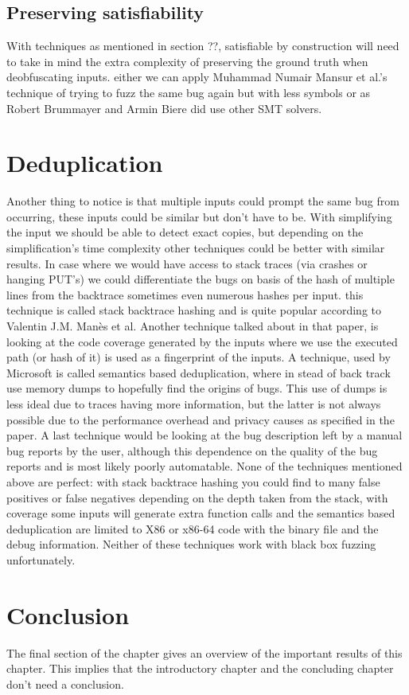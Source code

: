 \subsection{Preserving satisfiability}
With techniques as mentioned in section ??, satisfiable by construction will need to take in mind the extra complexity of preserving the ground truth when deobfuscating inputs. either we can apply Muhammad Numair Mansur et al.'s\cite{1mansur2020detecting} technique of trying to fuzz the same bug again but with less symbols or as Robert Brummayer and Armin Biere\cite{2FuzzingAndDelta-debuggingSMTSolvers} did use other SMT solvers.

\section{Deduplication}
\label{cha:3:Deduplication}
Another thing to notice is that multiple inputs could prompt the same bug from occurring, these inputs could be similar but don't have to be. With simplifying the input we should be able to detect exact copies, but depending on the simplification's time complexity other techniques could be better with similar results. In case where we would have access to stack traces (via crashes or hanging PUT's) we could differentiate the bugs on basis of the hash of multiple lines from the backtrace sometimes even numerous hashes per input. this technique is called stack backtrace hashing and is quite popular according to Valentin J.M. Man\`es et al\cite{13manes2019survey}. Another technique talked about in that paper, is looking at the code coverage generated by the inputs where we use the executed path (or hash of it) is used as a fingerprint of the inputs. A technique, used by Microsoft\cite{36semanticsAwareDeduplicationRETracer} is called semantics based deduplication, where in stead of back track use memory dumps to hopefully find the origins of bugs. This use of dumps is less ideal due to traces having more information, but the latter is not always possible due to the performance overhead and privacy causes as specified in the paper. A last technique would be looking at the bug description left by a manual bug reports by the user, although this dependence on the quality of the bug reports and is most likely poorly automatable. None of the techniques mentioned above are perfect: with stack backtrace hashing you could find to many false positives or false negatives depending on the depth taken from the stack, with coverage some inputs will generate extra function calls and the semantics based deduplication are limited to X86 or x86-64 code with the binary file and the debug information. Neither of these techniques work with black box fuzzing unfortunately.

\section{Conclusion}
\label{cha:3:Conclusion}
The final section of the chapter gives an overview of the important results
of this chapter. This implies that the introductory chapter and the
concluding chapter don't need a conclusion.


